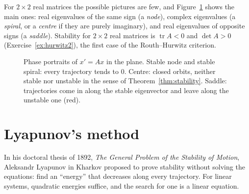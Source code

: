 For $2\times2$ real matrices the possible pictures are few, and Figure~\ref{fig:phase} shows the main ones: real eigenvalues of the
same sign (a \emph{node}), complex eigenvalues (a \emph{spiral}, or a \emph{centre} if they are purely imaginary), and real eigenvalues
of opposite signs (a \emph{saddle}). Stability for $2\times2$ real matrices is $\operatorname{tr}A<0$ and $\det A>0$
(Exercise~\ref{ex:hurwitz2}), the first case of the Routh--Hurwitz criterion.

\begin{figure}[ht]
\centering
{}
\caption{Phase portraits of $x'=Ax$ in the plane. Stable node and stable spiral: every trajectory tends to $0$. Centre: closed
orbits, neither stable nor unstable in the sense of Theorem~\ref{thm:stability}. Saddle: trajectories come in along the stable
eigenvector and leave along the unstable one (red).}
\label{fig:phase}
\end{figure}

\section{Lyapunov's method}

In his doctoral thesis of 1892, \emph{The General Problem of the Stability of Motion}, Aleksandr Lyapunov in Kharkov proposed to
prove stability without solving the equations: find an ``energy'' that decreases along every trajectory. For linear systems,
quadratic energies suffice, and the search for one is a linear equation.

